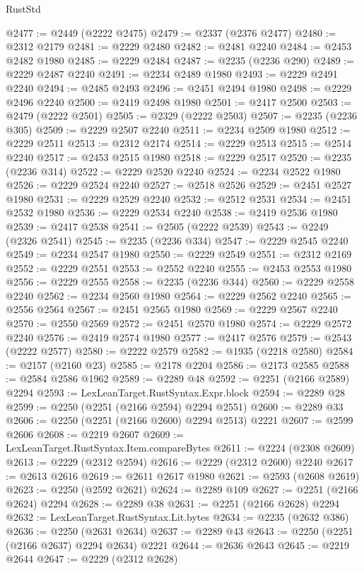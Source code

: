 \begin{lexlean}{RustStd}
\begin{coremodule}
@2477 := @2449 (@2222 @2475)
@2479 := @2337 (@2376 @2477)
@2480 := @2312 @2179
@2481 := @2229 @2480
@2482 := @2481 @2240
@2484 := @2453 @2482 @1980
@2485 := @2229 @2484
@2487 := @2235 (@2236 @290)
@2489 := @2229 @2487 @2240
@2491 := @2234 @2489 @1980
@2493 := @2229 @2491 @2240
@2494 := @2485 @2493
@2496 := @2451 @2494 @1980
@2498 := @2229 @2496 @2240
@2500 := @2419 @2498 @1980
@2501 := @2417 @2500
@2503 := @2479 (@2222 @2501)
@2505 := @2329 (@2222 @2503)
@2507 := @2235 (@2236 @305)
@2509 := @2229 @2507 @2240
@2511 := @2234 @2509 @1980
@2512 := @2229 @2511
@2513 := @2312 @2174
@2514 := @2229 @2513
@2515 := @2514 @2240
@2517 := @2453 @2515 @1980
@2518 := @2229 @2517
@2520 := @2235 (@2236 @314)
@2522 := @2229 @2520 @2240
@2524 := @2234 @2522 @1980
@2526 := @2229 @2524 @2240
@2527 := @2518 @2526
@2529 := @2451 @2527 @1980
@2531 := @2229 @2529 @2240
@2532 := @2512 @2531
@2534 := @2451 @2532 @1980
@2536 := @2229 @2534 @2240
@2538 := @2419 @2536 @1980
@2539 := @2417 @2538
@2541 := @2505 (@2222 @2539)
@2543 := @2249 (@2326 @2541)
@2545 := @2235 (@2236 @334)
@2547 := @2229 @2545 @2240
@2549 := @2234 @2547 @1980
@2550 := @2229 @2549
@2551 := @2312 @2169
@2552 := @2229 @2551
@2553 := @2552 @2240
@2555 := @2453 @2553 @1980
@2556 := @2229 @2555
@2558 := @2235 (@2236 @344)
@2560 := @2229 @2558 @2240
@2562 := @2234 @2560 @1980
@2564 := @2229 @2562 @2240
@2565 := @2556 @2564
@2567 := @2451 @2565 @1980
@2569 := @2229 @2567 @2240
@2570 := @2550 @2569
@2572 := @2451 @2570 @1980
@2574 := @2229 @2572 @2240
@2576 := @2419 @2574 @1980
@2577 := @2417 @2576
@2579 := @2543 (@2222 @2577)
@2580 := @2222 @2579
@2582 := @1935 (@2218 @2580)
@2584 := @2157 (@2160 @23)
@2585 := @2178 @2204
@2586 := @2173 @2585
@2588 := @2584 @2586 @1962
@2589 := @2289 @48
@2592 := @2251 (@2166 @2589) @2294
@2593 := LexLeanTarget.RustSyntax.Expr.block
@2594 := @2289 @28
@2599 := @2250 (@2251 (@2166 @2594) @2294 @2551)
@2600 := @2289 @33
@2606 := @2250 (@2251 (@2166 @2600) @2294 @2513) @2221
@2607 := @2599 @2606
@2608 := @2219 @2607
@2609 := LexLeanTarget.RustSyntax.Item.compareBytes
@2611 := @2224 (@2308 @2609)
@2613 := @2229 (@2312 @2594)
@2616 := @2229 (@2312 @2600) @2240
@2617 := @2613 @2616
@2619 := @2611 @2617 @1980
@2621 := @2593 (@2608 @2619)
@2623 := @2250 (@2592 @2621)
@2624 := @2289 @109
@2627 := @2251 (@2166 @2624) @2294
@2628 := @2289 @38
@2631 := @2251 (@2166 @2628) @2294
@2632 := LexLeanTarget.RustSyntax.Lit.bytes
@2634 := @2235 (@2632 @386)
@2636 := @2250 (@2631 @2634)
@2637 := @2289 @43
@2643 := @2250 (@2251 (@2166 @2637) @2294 @2634) @2221
@2644 := @2636 @2643
@2645 := @2219 @2644
@2647 := @2229 (@2312 @2628)

\end{coremodule}
\end{lexlean}
